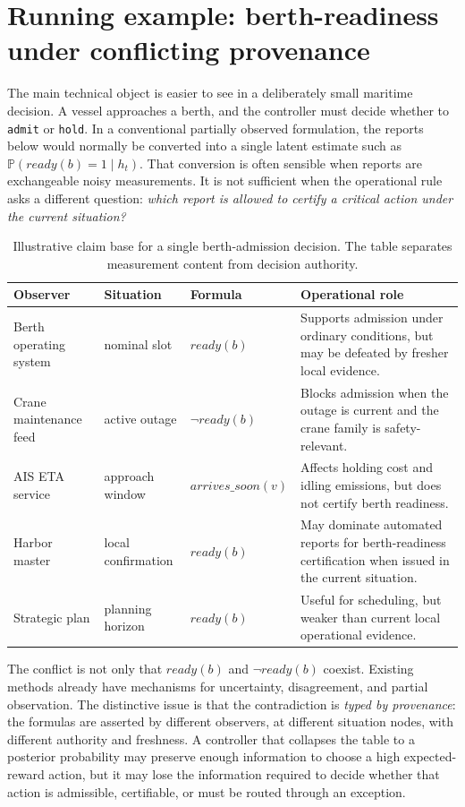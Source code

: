\documentclass[11pt]{article}
\newcommand{\Prob}{\mathbb{P}}
\newcommand{\1}{\mathbf{1}}
\theoremstyle{definition}
\theoremstyle{plain}
\theoremstyle{remark}
\begin{document}
\section{Running example: berth-readiness under conflicting provenance}
\label{sec:running-example}

The main technical object is easier to see in a deliberately small maritime decision. A vessel approaches a berth, and the controller must decide whether to \texttt{admit} or \texttt{hold}. In a conventional partially observed formulation, the reports below would normally be converted into a single latent estimate such as $\Prob(ready(b)=1\mid h_t)$. That conversion is often sensible when reports are exchangeable noisy measurements. It is not sufficient when the operational rule asks a different question: \emph{which report is allowed to certify a critical action under the current situation?}

\begin{table}[H]
\centering
\caption{Illustrative claim base for a single berth-admission decision. The table separates measurement content from decision authority.}
\label{tab:running-example}
\small
\begin{tabularx}{\textwidth}{@{}L{0.18\textwidth}L{0.17\textwidth}L{0.17\textwidth}Y@{}}
\toprule
Observer & Situation & Formula & Operational role \\
\midrule
Berth operating system & nominal slot & $ready(b)$ & Supports admission under ordinary conditions, but may be defeated by fresher local evidence. \\
Crane maintenance feed & active outage & $\neg ready(b)$ & Blocks admission when the outage is current and the crane family is safety-relevant. \\
AIS ETA service & approach window & $arrives\_soon(v)$ & Affects holding cost and idling emissions, but does not certify berth readiness. \\
Harbor master & local confirmation & $ready(b)$ & May dominate automated reports for berth-readiness certification when issued in the current situation. \\
Strategic plan & planning horizon & $ready(b)$ & Useful for scheduling, but weaker than current local operational evidence. \\
\bottomrule
\end{tabularx}
\end{table}

The conflict is not only that $ready(b)$ and $\neg ready(b)$ coexist. Existing methods already have mechanisms for uncertainty, disagreement, and partial observation. The distinctive issue is that the contradiction is \emph{typed by provenance}: the formulas are asserted by different observers, at different situation nodes, with different authority and freshness. A controller that collapses the table to a posterior probability may preserve enough information to choose a high expected-reward action, but it may lose the information required to decide whether that action is admissible, certifiable, or must be routed through an exception.
\end{document}
